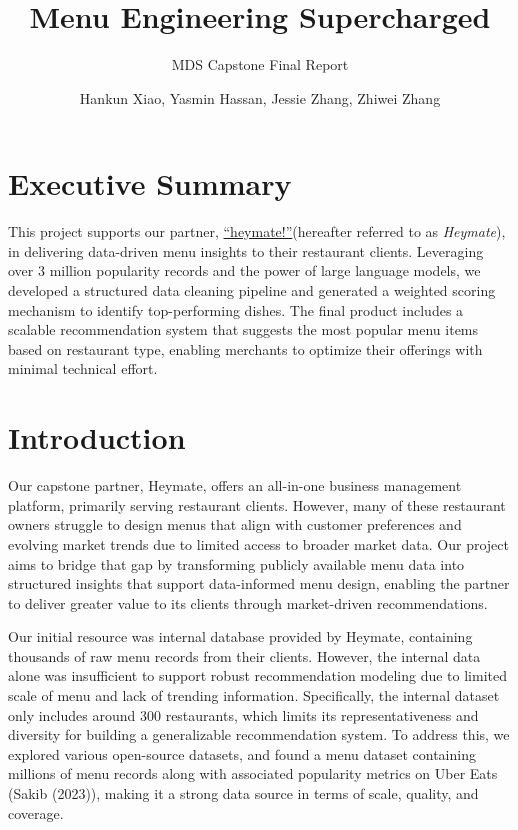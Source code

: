 \documentclass[
  11pt,
  a4paper,
  DIV=11,
  numbers=noendperiod]{scrartcl}
\title{Menu Engineering Supercharged}
\subtitle{MDS Capstone Final Report}
\author{Hankun Xiao, Yasmin Hassan, Jessie Zhang, Zhiwei Zhang}
\date{}
\renewcommand*\contentsname{Table of contents}
\newcommand\contentsname{Table of contents}
\begin{document}
\maketitle

\renewcommand*\contentsname{Table of contents}
{
\hypersetup{linkcolor=}
\setcounter{tocdepth}{2}
\tableofcontents
}

\section{Executive Summary}\label{executive-summary}

This project supports our partner,
\href{https://www.heymate.ca}{``heymate!''}(hereafter referred to as
\emph{Heymate}), in delivering data-driven menu insights to their
restaurant clients. Leveraging over 3 million popularity records and the
power of large language models, we developed a structured data cleaning
pipeline and generated a weighted scoring mechanism to identify
top-performing dishes. The final product includes a scalable
recommendation system that suggests the most popular menu items based on
restaurant type, enabling merchants to optimize their offerings with
minimal technical effort.

\section{Introduction}\label{introduction}

Our capstone partner, Heymate, offers an all-in-one business management
platform, primarily serving restaurant clients. However, many of these
restaurant owners struggle to design menus that align with customer
preferences and evolving market trends due to limited access to broader
market data. Our project aims to bridge that gap by transforming
publicly available menu data into structured insights that support
data-informed menu design, enabling the partner to deliver greater value
to its clients through market-driven recommendations.

Our initial resource was internal database provided by Heymate,
containing thousands of raw menu records from their clients. However,
the internal data alone was insufficient to support robust
recommendation modeling due to limited scale of menu and lack of
trending information. Specifically, the internal dataset only includes
around 300 restaurants, which limits its representativeness and
diversity for building a generalizable recommendation system. To address
this, we explored various open-source datasets, and found a menu dataset
containing millions of menu records along with associated popularity
metrics on Uber Eats (Sakib (2023)), making it a strong data source in
terms of scale, quality, and coverage.
\end{document}

